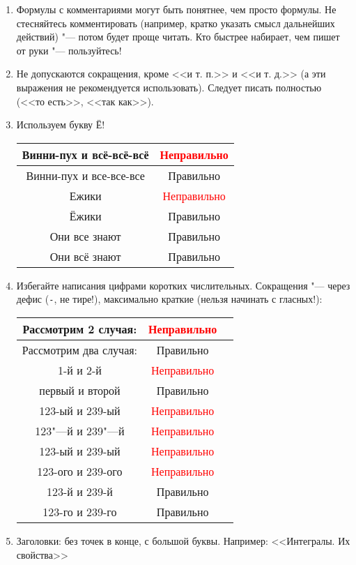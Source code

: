 \documentclass[12pt,a4paper]{book}
\newcommand{\ok}{& \textcolor{green!60!black}{Правильно}}
\newcommand{\bad}{& \textcolor{red}{Неправильно}}
\begin{document}
\begin{enumerate}
\item
	Формулы с комментариями могут быть понятнее, чем просто формулы.
	Не стесняйтесь комментировать (например, кратко указать смысл
	дальнейших действий) "--- потом будет проще читать.
	Кто быстрее набирает, чем пишет от руки "--- пользуйтесь!

\item
	Не допускаются сокращения, кроме <<и т. п.>> и <<и т. д.>> (а эти выражения не рекомендуется использовать).
	Следует писать полностью (<<то есть>>, <<так как>>).
	
\item Используем букву Ё!
	\begin{center}\begin{tabular}{|c|c|}
		\hline Винни-пух и всё-всё-всё \bad \\
		\hline Винни-пух и все-все-все \ok \\
		\hline Ежики \bad \\
		\hline Ёжики \ok \\
		\hline Они все знают \ok \\
		\hline Они всё знают \ok \\
		\hline
	\end{tabular}\end{center}

\item
	Избегайте написания цифрами коротких числительных.
	Сокращения "--- через дефис (\verb!-!, не тире!), максимально краткие (нельзя начинать с гласных!):
	\begin{center}\begin{tabular}{|c|c|c|}
		\hline Рассмотрим 2 случая: \bad \\
		\hline Рассмотрим два случая: \ok \\
		\hline 1-й и 2-й \bad \\
		\hline первый и второй \ok\\
		\hline 123-ый и 239-ый \bad \\
		\hline 123"---й и 239"---й \bad \\
		\hline 123-ый и 239-ый \bad \\
		\hline 123-ого и 239-ого \bad \\
		\hline 123-й и 239-й \ok \\
		\hline 123-го и 239-го \ok \\
		\hline
	\end{tabular}\end{center}

\item
	Заголовки: без точек в конце, с большой буквы. Например: <<Интегралы. Их свойства>>
\end{enumerate}
\end{document}
